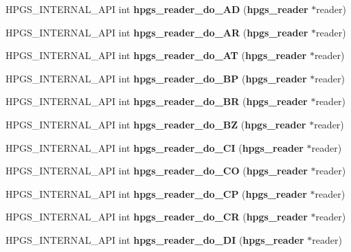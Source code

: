 \begin{CompactItemize}
\item 
HPGS\_\-INTERNAL\_\-API int \textbf{hpgs\_\-reader\_\-do\_\-AD} ({\bf hpgs\_\-reader} $\ast$reader)\label{group__reader_g252127da0d20f8cd4e12a237b6ffd607}

\item 
HPGS\_\-INTERNAL\_\-API int \textbf{hpgs\_\-reader\_\-do\_\-AR} ({\bf hpgs\_\-reader} $\ast$reader)\label{group__reader_g86a3dddc71091bb81d539c66d24fc4c9}

\item 
HPGS\_\-INTERNAL\_\-API int \textbf{hpgs\_\-reader\_\-do\_\-AT} ({\bf hpgs\_\-reader} $\ast$reader)\label{group__reader_gfaf903cb7a0bee57742b36cf3bda84ef}

\item 
HPGS\_\-INTERNAL\_\-API int \textbf{hpgs\_\-reader\_\-do\_\-BP} ({\bf hpgs\_\-reader} $\ast$reader)\label{group__reader_g69c12a593041db66395999b17ff614f3}

\item 
HPGS\_\-INTERNAL\_\-API int \textbf{hpgs\_\-reader\_\-do\_\-BR} ({\bf hpgs\_\-reader} $\ast$reader)\label{group__reader_g9a5a78c77c1bbe343f0a54a035b3daee}

\item 
HPGS\_\-INTERNAL\_\-API int \textbf{hpgs\_\-reader\_\-do\_\-BZ} ({\bf hpgs\_\-reader} $\ast$reader)\label{group__reader_g14d74945da68ed7c713e2ba8b6deef16}

\item 
HPGS\_\-INTERNAL\_\-API int \textbf{hpgs\_\-reader\_\-do\_\-CI} ({\bf hpgs\_\-reader} $\ast$reader)\label{group__reader_g7dd9c64eff1ea790e1b43a81b2586af6}

\item 
HPGS\_\-INTERNAL\_\-API int \textbf{hpgs\_\-reader\_\-do\_\-CO} ({\bf hpgs\_\-reader} $\ast$reader)\label{group__reader_g010ac6b403b6ef801122e303784506e3}

\item 
HPGS\_\-INTERNAL\_\-API int \textbf{hpgs\_\-reader\_\-do\_\-CP} ({\bf hpgs\_\-reader} $\ast$reader)\label{group__reader_g59c9616bc0e3e63266eede7f0e40ab27}

\item 
HPGS\_\-INTERNAL\_\-API int \textbf{hpgs\_\-reader\_\-do\_\-CR} ({\bf hpgs\_\-reader} $\ast$reader)\label{group__reader_g6f9a3d39f1ec43f65de23f39cbcc4bcd}

\item 
HPGS\_\-INTERNAL\_\-API int \textbf{hpgs\_\-reader\_\-do\_\-DI} ({\bf hpgs\_\-reader} $\ast$reader)\label{group__reader_gcb1099ab784c6f006f90a555e999d03c}


\end{CompactItemize}
